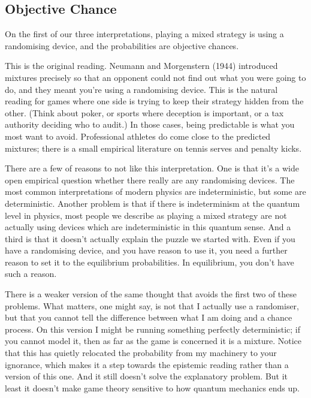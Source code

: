 \documentclass[
  11pt,
  letterpaper,
]{scrbook}
\begin{document}
\subsection{Objective Chance}\label{objective-chance}

On the first of our three interpretations, playing a mixed strategy is
using a randomising device, and the probabilities are objective chances.

This is the original reading. Neumann and Morgenstern (1944) introduced
mixtures precisely so that an opponent could not find out what you were
going to do, and they meant you're using a randomising device. This is
the natural reading for games where one side is trying to keep their
strategy hidden from the other. (Think about poker, or sports where
deception is important, or a tax authority deciding who to audit.) In
those cases, being predictable is what you most want to avoid.
Professional athletes do come close to the predicted mixtures; there is
a small empirical literature on tennis serves and penalty kicks.

There are a few of reasons to not like this interpretation. One is that
it's a wide open empirical question whether there really are any
randomising devices. The most common interpretations of modern physics
are indeterministic, but some are deterministic. Another problem is that
if there is indeterminism at the quantum level in physics, most people
we describe as playing a mixed strategy are not actually using devices
which are indeterministic in this quantum sense. And a third is that it
doesn't actually explain the puzzle we started with. Even if you have a
randomising device, and you have reason to use it, you need a further
reason to set it to the equilibrium probabilities. In equilibrium, you
don't have such a reason.

There is a weaker version of the same thought that avoids the first two
of these problems. What matters, one might say, is not that I actually
use a randomiser, but that you cannot tell the difference between what I
am doing and a chance process. On this version I might be running
something perfectly deterministic; if you cannot model it, then as far
as the game is concerned it is a mixture. Notice that this has quietly
relocated the probability from my machinery to your ignorance, which
makes it a step towards the epistemic reading rather than a version of
this one. And it still doesn't solve the explanatory problem. But it
least it doesn't make game theory sensitive to how quantum mechanics
ends up.
\end{document}
